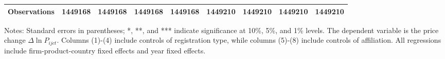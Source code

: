 \documentclass[12pt]{article}
\begin{document}
\begin{table}
\begin{threeparttable}
\begin{tabular}{lcccccccc}
			Observations & 1449168 & 1449168 & 1449168 & 1449168 & 1449210 & 1449210 & 1449210 & 1449210\\
			\bottomrule
		\end{tabular}
		\begin{tablenotes}
			\footnotesize
			\item[Notes:] Standard errors in parentheses; *, **, and *** indicate significance at 10\%, 5\%, and 1\% levels. The dependent variable is the price change $\Delta \ln P_{ijct}$. Columns (1)-(4) include controls of registration type, while columns (5)-(8) include controls of affiliation. All regressions include firm-product-country fixed effects and year fixed effects.
		\end{tablenotes}
	\end{threeparttable}
	\label{tab.robust.ownership}
\end{table}
\end{document}
